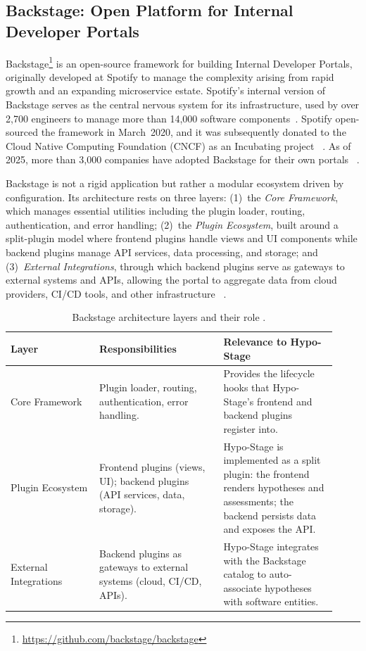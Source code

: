 \subsection{Backstage: Open Platform for Internal Developer Portals}
\label{subsec:backstage}

Backstage\footnote{\url{https://github.com/backstage/backstage}} is an open-source framework for building Internal Developer Portals,
originally developed at Spotify to manage the complexity arising from rapid growth and
an expanding microservice estate. Spotify's internal version of Backstage serves as the
central nervous system for its infrastructure, used by over 2,700 engineers to manage
more than 14,000 software components~\citep{backstage2024}. Spotify open-sourced the
framework in March~2020, and it was subsequently donated to the Cloud Native
Computing Foundation (CNCF) as an Incubating project ~\citep{backstage2024}. As of
2025, more than 3,000 companies have adopted Backstage for their own
portals ~\citep{backstage2024}.

Backstage is not a rigid application but rather a modular ecosystem driven by
configuration. Its architecture rests on three layers: (1)~the \emph{Core Framework},
which manages essential utilities including the plugin loader, routing, authentication,
and error handling; (2)~the \emph{Plugin Ecosystem}, built around a split-plugin model
where frontend plugins handle views and UI components while backend plugins manage
API services, data processing, and storage; and (3)~\emph{External Integrations}, through
which backend plugins serve as gateways to external systems and APIs, allowing the
portal to aggregate data from cloud providers, CI/CD tools, and other
infrastructure ~\citep{backstage2024}.

\begin{table}[htbp]
\centering
\caption{Backstage architecture layers and their role \citep{backstage2024}.}
\label{tab:backstage-layers}
\begin{tabular}{p{0.25\linewidth} p{0.35\linewidth} p{0.32\linewidth}}
\toprule
\textbf{Layer} & \textbf{Responsibilities} & \textbf{Relevance to Hypo-Stage} \\
\midrule
Core Framework & Plugin loader, routing, authentication, error handling. & Provides the lifecycle hooks that Hypo-Stage's frontend and backend plugins register into. \\
\midrule
Plugin Ecosystem & Frontend plugins (views, UI); backend plugins (API services, data, storage). & Hypo-Stage is implemented as a split plugin: the frontend renders hypotheses and assessments; the backend persists data and exposes the API. \\
\midrule
External Integrations & Backend plugins as gateways to external systems (cloud, CI/CD, APIs). & Hypo-Stage integrates with the Backstage catalog to auto-associate hypotheses with software entities. \\
\bottomrule
\end{tabular}
\end{table}

